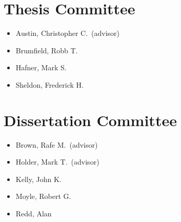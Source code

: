 \documentclass[10pt]{article}
\begin{document}
\raggedright
\singlespacing

\section*{Thesis Committee}
\begin{itemize}
    \item Austin, Christopher C.\ (advisor)
    \item Brumfield, Robb T.
    \item Hafner, Mark S.
    \item Sheldon, Frederick H.
\end{itemize}

\section*{Dissertation Committee}
\begin{itemize}
    \item Brown, Rafe M.\ (advisor)
    \item Holder, Mark T.\ (advisor)
    \item Kelly, John K.
    \item Moyle, Robert G.
    \item Redd, Alan
\end{itemize}
\end{document}
